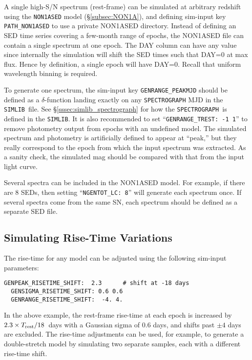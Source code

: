 \documentclass[12pt]{article}
\newcommand{\Trest}{T_{\rm rest}}
\newcommand{\SPEC}{{\tt SPECTROGRAPH}}
\newcommand{\simlib}{{\tt SIMLIB}}
\begin{document}
A single high-S/N spectrum (rest-frame) can be simulated 
at arbitrary redshift using the {\tt NON1ASED} model 
(\S\ref{subsec:NON1A}), and defining sim-input key 
{\tt PATH\_NON1ASED} to use a private NON1ASED directory.
Instead of defining an SED time
series covering a few-month range of epochs, the NON1ASED
file can contain a single spectrum at one epoch. 
The DAY column can have any value since internally the
simulation will shift the SED times such that DAY=0 
at max flux. Hence by definition, a single epoch will
have DAY=0. Recall that uniform wavelength binning is required.

To generate one spectrum, the sim-input key {\tt GENRANGE\_PEAKMJD}
should be defined as a $\delta$-function landing exactly on any
{\SPEC} MJD in the \simlib\ file.
See \S\ref{sssec:simlib_spectrograph} for how the
\SPEC\ is defined in the \simlib.
It is also recommended to set ``{\tt GENRANGE\_TREST: -1 1}''
to remove photometry output from epochs with an undefined model.
The simulated spectrum and photometry is artificially defined
to appear at ``peak,'' but they really correspond to the epoch
from which the input spectrum was extracted. 
As a sanity check, the simulated mag should be compared with 
that from the input light curve.

Several spectra can be included in the NON1ASED model.
For example, if there are 8 SEDs, then setting 
``{\tt NGENTOT\_LC: 8}'' will generate each spectrum once.
If several spectra come from the same SN,
each spectrum should be defined as a separate SED file.



\subsection{Simulating Rise-Time Variations}
\label{subsec:simRiseTime}

The rise-time for any model can be adjusted using 
the following sim-input parameters:
\begin{Verbatim}[frame=single]
  GENPEAK_RISETIME_SHIFT:  2.3      # shift at -18 days
  GENSIGMA_RISETIME_SHIFT: 0.6 0.6
  GENRANGE_RISETIME_SHIFT:  -4. 4.
\end{Verbatim}
%
In the above example, the rest-frame rise-time at each epoch
is increased by $2.3\times \Trest/18$~days
with a Gaussian sigma of 0.6 days,
and shifts past $\pm 4$ days are excluded.
The rise-time adjustments can be used, for example, 
to generate a double-stretch model by simulating 
two separate samples, each with a different 
rise-time shift.
\end{document}
